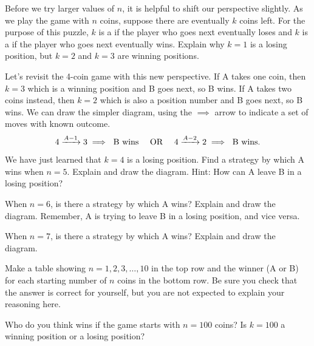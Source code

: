 \begin{act}
\begin{actpart}
        \item Before we try larger values of $n$, it is helpful to shift our perspective slightly. As we play the game with $n$ coins, suppose there are eventually $k$ coins left.  For the purpose of this puzzle, $k$ is a  if the player who goes next eventually loses and $k$ is a  if the player who goes next eventually wins.  Explain why $k=1$ is a losing position, but $k=2$ and $k=3$ are winning positions.
        
        \item Let's revisit the 4-coin game with this new perspective. If A takes one coin, then $k=3$ which is a winning position and B goes next, so B wins.  If A takes two coins instead, then $k=2$ which is also a position number and B goes next, so B wins.  We can draw the simpler diagram, using the $\implies$ arrow to indicate a set of moves with known outcome.
        $$ 4 \xrightarrow{A-1} 3 \implies \text{ B wins} \text{ \quad OR \quad } 4 \xrightarrow{A-2} 2 \implies \text{ B wins}.$$
        We have just learned that $k=4$ is a losing position. 
        Find a strategy by which A wins when $n = 5$.  Explain and draw the diagram. Hint: How can A leave B in a losing position?%
        
        \item When $n = 6$, is there a strategy by which A wins?  Explain and draw the diagram.  Remember, A is trying to leave B in a losing position, and vice versa.%
        
        \item When $n = 7$, is there a strategy by which A wins?  Explain and draw the diagram. %
        
        \item Make a table showing $n=1,2,3,\ldots, 10$ in the top row and the winner (A or B) for each starting number of $n$ coins in the bottom row.  Be sure you check that the answer is correct for yourself, but you are not expected to explain your reasoning here.  
        
        \item Who do you think wins if the game starts with $n = 100$ coins? Is $k=100$ a winning position or a losing position? %
    \end{actpart}
\end{act}

